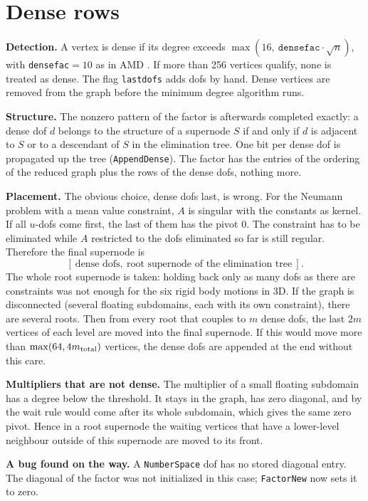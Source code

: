 \documentclass[10pt,a4paper]{article}
\newcommand{\code}[1]{\texttt{#1}}
\begin{document}
\section{Dense rows}\label{sec:dense}

\textbf{Detection.} A vertex is dense if its degree exceeds $\max(16,\ \code{densefac}\cdot\sqrt n)$, with \code{densefac}${}=10$ as in AMD \cite{amd}. If more than 256 vertices qualify, none is treated as dense. The flag \code{lastdofs} adds dofs by hand. Dense vertices are removed from the graph before the minimum degree algorithm runs.

\textbf{Structure.} The nonzero pattern of the factor is afterwards completed exactly: a dense dof $d$ belongs to the structure of a supernode $S$ if and only if $d$ is adjacent to $S$ or to a descendant of $S$ in the elimination tree. One bit per dense dof is propagated up the tree (\code{AppendDense}). The factor has the entries of the ordering of the reduced graph plus the rows of the dense dofs, nothing more.

\textbf{Placement.} The obvious choice, dense dofs last, is wrong. For the Neumann problem with a mean value constraint, $A$ is singular with the constants as kernel. If all $u$-dofs come first, the last of them has the pivot $0$. The constraint has to be eliminated while $A$ restricted to the dofs eliminated so far is still regular. Therefore the final supernode is
\[
[\ \text{dense dofs},\ \text{root supernode of the elimination tree}\ ].
\]
The whole root supernode is taken: holding back only as many dofs as there are constraints was not enough for the six rigid body motions in 3D.
If the graph is disconnected (several floating subdomains, each with its own constraint), there are several roots. Then from every root that couples to $m$ dense dofs, the last $2m$ vertices of each level are moved into the final supernode. If this would move more than $\max(64, 4m_{\rm total})$ vertices, the dense dofs are appended at the end without this care.

\textbf{Multipliers that are not dense.} The multiplier of a small floating subdomain has a degree below the threshold. It stays in the graph, has zero diagonal, and by the wait rule would come after its whole subdomain, which gives the same zero pivot. Hence in a root supernode the waiting vertices that have a lower-level neighbour outside of this supernode are moved to its front.

\textbf{A bug found on the way.} A \code{NumberSpace} dof has no stored diagonal entry. The diagonal of the factor was not initialized in this case; \code{FactorNew} now sets it to zero.
\end{document}

